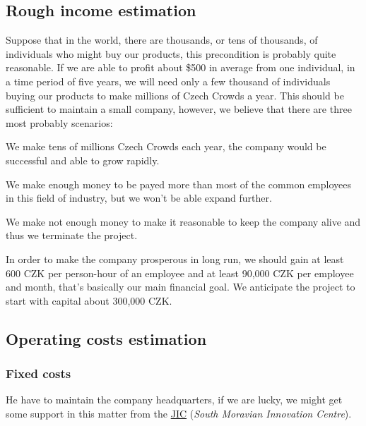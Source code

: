 \documentclass[a4paper,twoside,15pt]{book}
\begin{document}
        \subsection{Rough income estimation}
            Suppose that in the world, there are thousands, or tens of thousands, of individuals who might buy our products, this precondition is probably quite reasonable. If we are able to profit about \$500 in average from one individual, in a time period of five years, we will need only a few thousand of individuals buying our products to make millions of Czech Crowds a year. This should be sufficient to maintain a small company, however, we believe that there are three most probably scenarios:
            \begin{dinglist}{73}
                \item[\ding{246}] We make tens of millions Czech Crowds each year, the company would be successful and able to grow rapidly.
                \item[\ding{245}] We make enough money to be payed more than most of the common employees in this field of industry, but we won't be able expand further.
                \item[\ding{244}] We make not enough money to make it reasonable to keep the company alive and thus we terminate the project.
             \end{dinglist}
             In order to make the company prosperous in long run, we should gain at least 600 CZK per person-hour of an employee and at least 90,000 CZK per employee and month, that's basically our main financial goal. We anticipate the project to start with capital about 300,000 CZK.

        \subsection{Operating costs estimation}
            \subsubsection{Fixed costs}
                He have to maintain the company headquarters, if we are lucky, we might get some support in this matter from the \href{http://www.jic.cz/}{JIC} (\textit{South Moravian Innovation Centre}).
\end{document}
